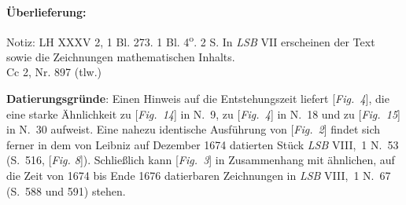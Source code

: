 \begin{ledgroupsized}[r]{120mm}
\footnotesize 
\pstart 
\noindent\textbf{\"{U}berlieferung:}
\pend
\end{ledgroupsized}
\begin{ledgroupsized}[r]{114mm}
\footnotesize 
\pstart \parindent -6mm
Notiz: LH XXXV 2, 1 Bl. 273. 1 Bl. 4\textsuperscript{o}. 2 S. In \textit{LSB} VII erscheinen der Text sowie die Zeichnungen mathematischen Inhalts.
\\Cc 2, Nr. 897 (tlw.)\pend
\end{ledgroupsized}
 
\vspace*{4mm}
\begin{ledgroup}
\footnotesize 
\pstart
\noindent\footnotesize{\textbf{Datierungsgr\"{u}nde}: Einen Hinweis auf die Entstehungszeit liefert [\textit{Fig.~4}],
die eine starke Ähnlichkeit zu [\textit{Fig.~14}] in N.~9,
zu [\textit{Fig.~4}] in N.~18
und zu [\textit{Fig.~15}] in N.~30
aufweist.
Eine nahezu identische Ausführung von [\textit{Fig.~2}] findet sich ferner
in dem von Leibniz auf Dezember 1674 datierten Stück \textit{LSB} VIII,~1 N.~53 (S.~516, [\textit{Fig. 8}]).
Schließlich kann [\textit{Fig.~3}] in Zusammenhang mit ähnlichen, auf die Zeit von 1674 bis Ende 1676 datierbaren Zeichnungen
in \textit{LSB} VIII,~1 N.~67 (S.~588 und 591) stehen.}
\pend
\end{ledgroup}

